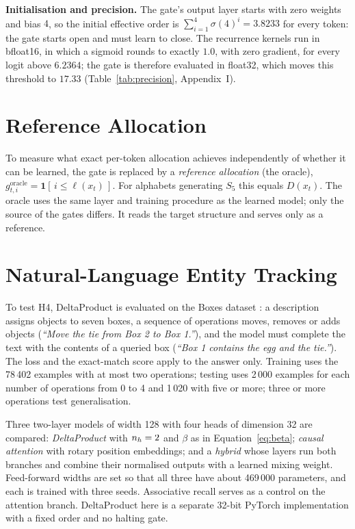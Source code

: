 \textbf{Initialisation and precision.} The gate's output layer starts with zero weights and bias $4$, so the initial effective order is $\sum_{i=1}^{4}\sigma(4)^{i} = 3.8233$ for every token: the gate starts open and must learn to close. The recurrence kernels run in bfloat16, in which a sigmoid rounds to exactly $1.0$, with zero gradient, for every logit above $6.2364$; the gate is therefore evaluated in float32, which moves this threshold to $17.33$ (Table~\ref{tab:precision}, Appendix~I).

\section{Reference Allocation}
\label{sec:oracle}
To measure what exact per-token allocation achieves independently of whether it can be learned, the gate is replaced by a \emph{reference allocation} (the oracle), $g^{\text{oracle}}_{t,i} = \mathbf{1}[\, i \le \ell(x_t) \,]$. For alphabets generating $S_5$ this equals $D(x_t)$. The oracle uses the same layer and training procedure as the learned model; only the source of the gates differs. It reads the target structure and serves only as a reference.

\section{Natural-Language Entity Tracking}
\label{sec:nlp-method}
To test H4, DeltaProduct is evaluated on the Boxes dataset \cite{entitytracking}: a description assigns objects to seven boxes, a sequence of operations moves, removes or adds objects (\emph{``Move the tie from Box 2 to Box 1.''}), and the model must complete the text with the contents of a queried box (\emph{``Box 1 contains the egg and the tie.''}). The loss and the exact-match score apply to the answer only. Training uses the 78\,402 examples with at most two operations; testing uses 2\,000 examples for each number of operations from 0 to 4 and 1\,020 with five or more; three or more operations test generalisation.

Three two-layer models of width 128 with four heads of dimension 32 are compared: \emph{DeltaProduct} with $n_h = 2$ and $\beta$ as in Equation~\ref{eq:beta}; \emph{causal attention} with rotary position embeddings; and a \emph{hybrid} whose layers run both branches and combine their normalised outputs with a learned mixing weight. Feed-forward widths are set so that all three have about 469\,000 parameters, and each is trained with three seeds. Associative recall serves as a control on the attention branch. DeltaProduct here is a separate 32-bit PyTorch implementation with a fixed order and no halting gate.
